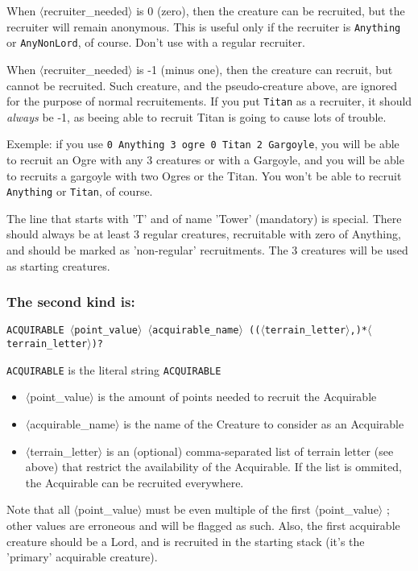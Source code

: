 \documentclass{article}
\begin{document}
When $\langle$recruiter\_needed$\rangle$ is 0 (zero), then the creature can be recruited, but the recruiter will remain anonymous. This is useful only if the recruiter is \texttt{Anything} or \texttt{AnyNonLord}, of course. Don't use with a regular recruiter.

When $\langle$recruiter\_needed$\rangle$ is -1 (minus one), then the creature can recruit, but cannot be recruited. Such creature, and the pseudo-creature above, are ignored for the purpose of normal recruitements. If you put \texttt{Titan} as a recruiter, it should \emph{always} be -1, as beeing able to recruit Titan is going to cause lots of trouble.

Exemple: if you use \texttt{0 Anything 3 ogre 0 Titan 2 Gargoyle}, you will be able to recruit an Ogre with any 3 creatures or with a Gargoyle, and you will be able to recruits a gargoyle with two Ogres or the Titan. You won't be able to recruit \texttt{Anything} or \texttt{Titan}, of course.

The line that starts with 'T' and of name 'Tower' (mandatory) is special. There should always be at least 3 regular creatures, recruitable with zero of Anything, and should be marked as 'non-regular' recruitments. The 3 creatures will be used as starting creatures.

\subsubsection*{The second kind is:}

\texttt{\texttt{ACQUIRABLE} $\langle$point\_value$\rangle$ $\langle$acquirable\_name$\rangle$ (($\langle$terrain\_letter$\rangle$,)*$\langle$terrain\_letter$\rangle$)?}

\texttt{ACQUIRABLE} is the literal string \texttt{ACQUIRABLE}

\begin{itemize}
\item $\langle$point\_value$\rangle$ is the amount of points needed to recruit the Acquirable
\item $\langle$acquirable\_name$\rangle$ is the name of the Creature to consider as an Acquirable
\item $\langle$terrain\_letter$\rangle$ is an (optional) comma-separated list of terrain letter (see above) that restrict the availability of the Acquirable. If the list is ommited, the Acquirable can be recruited everywhere.
\end{itemize}

Note that all $\langle$point\_value$\rangle$ must be even multiple of the first $\langle$point\_value$\rangle$ ; other values are erroneous and will be flagged as such. Also, the first acquirable creature should be a Lord, and is recruited in the starting stack (it's the 'primary' acquirable creature).
\end{document}
